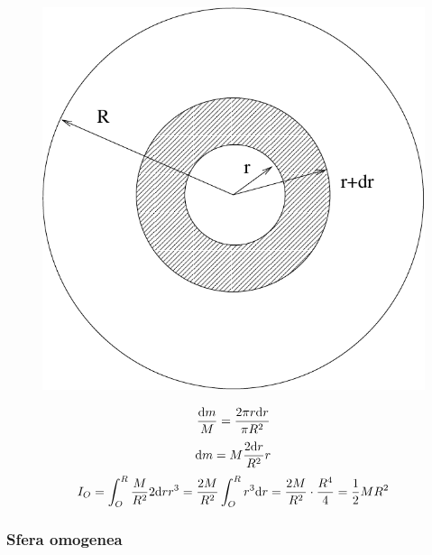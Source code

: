 \begin{figure}[htbp]
   \centering
   \includegraphics[scale=0.3]{immagini/fisica1/disco}
\end{figure}

\begin{equation*}\frac{\mathrm{d} m}{M}=\frac{2\pi r\mathrm{d} r}{\pi R^2}\end{equation*}
\begin{equation*}\mathrm{d} m=M\frac{2\mathrm{d} r}{R^2}r\end{equation*}
$$I_O=\int_O^R\frac{M}{R^2}2\mathrm{d} r r^3=\frac{2M}{R^2}\int_O^R r^3
\mathrm{d} r=\frac{2M}{R^2}\cdot\frac{R^4}{4}=\frac{1}{2}MR^2$$

\subsubsection{Sfera omogenea}

